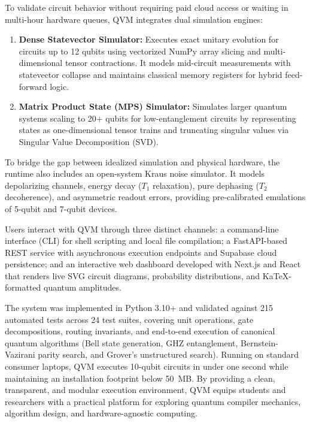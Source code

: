 To validate circuit behavior without requiring paid cloud access or waiting in multi-hour hardware queues, QVM integrates dual simulation engines:
\begin{enumerate}
    \item \textbf{Dense Statevector Simulator:} Executes exact unitary evolution for circuits up to 12 qubits using vectorized NumPy array slicing and multi-dimensional tensor contractions. It models mid-circuit measurements with statevector collapse and maintains classical memory registers for hybrid feed-forward logic.
    \item \textbf{Matrix Product State (MPS) Simulator:} Simulates larger quantum systems scaling to 20+ qubits for low-entanglement circuits by representing states as one-dimensional tensor trains and truncating singular values via Singular Value Decomposition (SVD).
\end{enumerate}

To bridge the gap between idealized simulation and physical hardware, the runtime also includes an open-system Kraus noise simulator. It models depolarizing channels, energy decay ($T_1$ relaxation), pure dephasing ($T_2$ decoherence), and asymmetric readout errors, providing pre-calibrated emulations of 5-qubit and 7-qubit devices.

Users interact with QVM through three distinct channels: a command-line interface (CLI) for shell scripting and local file compilation; a FastAPI-based REST service with asynchronous execution endpoints and Supabase cloud persistence; and an interactive web dashboard developed with Next.js and React that renders live SVG circuit diagrams, probability distributions, and KaTeX-formatted quantum amplitudes.

The system was implemented in Python 3.10+ and validated against 215 automated tests across 24 test suites, covering unit operations, gate decompositions, routing invariants, and end-to-end execution of canonical quantum algorithms (Bell state generation, GHZ entanglement, Bernstein-Vazirani parity search, and Grover's unstructured search). Running on standard consumer laptops, QVM executes 10-qubit circuits in under one second while maintaining an installation footprint below 50~MB. By providing a clean, transparent, and modular execution environment, QVM equips students and researchers with a practical platform for exploring quantum compiler mechanics, algorithm design, and hardware-agnostic computing.

\vspace{0.8cm}

